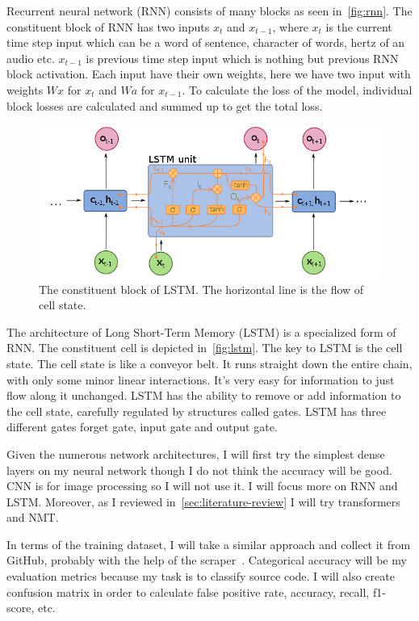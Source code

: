 Recurrent neural network (RNN) consists of many blocks as seen in~\autoref{fig:rnn}.
The constituent block of RNN has two inputs $x_t$ and $x_{t-1}$, where  $x_t$ is the current time step input which can be a word of sentence, character of words, hertz of an audio etc. $x_{t-1}$ is previous time step input which is nothing but previous RNN block activation. Each input have their own weights, here we have two input with weights $Wx$ for $x_t$ and $Wa$ for $x_{t-1}$.
To calculate the loss of the model, individual block losses are calculated and summed up to get the total loss.

\begin{figure}[ht]
\centering
\includegraphics[width=0.7\linewidth]{lstm-big}
\caption{The constituent block of LSTM. The horizontal line is the flow of cell state.}
\label{fig:lstm}
\end{figure}

The architecture of Long Short-Term Memory (LSTM) is a specialized form of RNN. The constituent cell is depicted in~\autoref{fig:lstm}.
The key to LSTM is the cell state.
The cell state is like a conveyor belt. It runs straight down the entire chain, with only some minor linear interactions. It's very easy for information to just flow along it unchanged. LSTM has the ability to remove or add information to the cell state, carefully regulated by structures called gates.
LSTM has three different gates forget gate, input gate and output gate.


Given the numerous network architectures, I will first try the simplest dense layers on my neural network though I do not think the accuracy will be good.
CNN is for image processing so I will not use it.
I will focus more on RNN and LSTM.
Moreover, as I reviewed in~\autoref{sec:literature-review} I will try transformers and NMT.


In terms of the training dataset, I will take a similar approach and collect it from GitHub, probably with the help of the scraper~\cite{alexandru2017replicating}.
Categorical accuracy will be my evaluation metrics because my task is to classify source code.
I will also create confusion matrix in order to calculate false positive rate, accuracy, recall, f1-score, etc.


